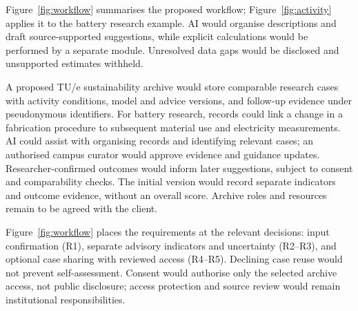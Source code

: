 \documentclass[11pt,a4paper]{article}
\begin{document}
Figure~\ref{fig:workflow} summarises the proposed workflow; Figure~\ref{fig:activity} applies it to the battery research example. AI would organise descriptions and draft source-supported suggestions, while explicit calculations would be performed by a separate module. Unresolved data gaps would be disclosed and unsupported estimates withheld.

A proposed TU/e sustainability archive would store comparable research cases with activity conditions, model and advice versions, and follow-up evidence under pseudonymous identifiers. For battery research, records could link a change in a fabrication procedure to subsequent material use and electricity measurements. AI could assist with organising records and identifying relevant cases; an authorised campus curator would approve evidence and guidance updates. Researcher-confirmed outcomes would inform later suggestions, subject to consent and comparability checks. The initial version would record separate indicators and outcome evidence, without an overall score. Archive roles and resources remain to be agreed with the client.

Figure~\ref{fig:workflow} places the requirements at the relevant decisions: input confirmation (R1), separate advisory indicators and uncertainty (R2--R3), and optional case sharing with reviewed access (R4--R5). Declining case reuse would not prevent self-assessment. Consent would authorise only the selected archive access, not public disclosure; access protection and source review would remain institutional responsibilities.
\end{document}
